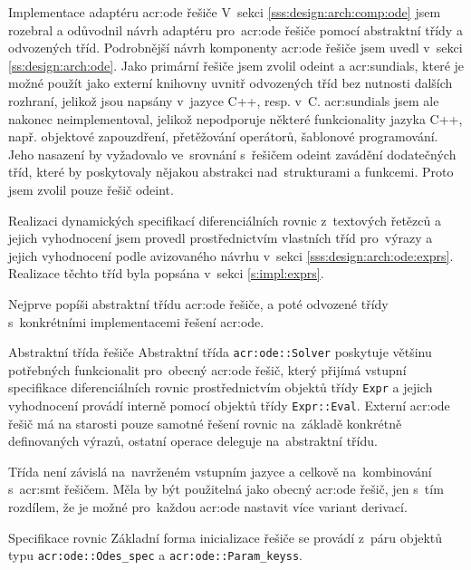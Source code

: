 \documentclass[thesis=M,czech]{FITthesis}[2012/06/26]
\newcommand{\acrlabel}[1]{acr:#1}
\newcommand{\acr}[1]{\acrshort{\acrlabel{#1}}}
\newcommand{\id}[1]{\texttt{#1}}
\newcommand{\rf}[1]{\ref{#1}}
\begin{document}
\begin{section}{Implementace adaptéru \acr{ode} řešiče}\label{s:impl:ode}
V~sekci \rf{sss:design:arch:comp:ode} jsem rozebral
a odůvodnil návrh adaptéru pro~\acr{ode} řešiče
pomocí abstraktní třídy a odvozených tříd.
Podrobnější návrh komponenty \acr{ode} řešiče
jsem uvedl v~sekci \rf{ss:design:arch:ode}.
Jako primární řešiče jsem zvolil odeint a \acr{sundials},
které je možné použít jako externí knihovny
uvnitř odvozených tříd bez nutnosti dalších rozhraní,
jelikož jsou napsány v~jazyce C++, resp. v~C.
\acr{sundials} jsem ale nakonec neimplementoval,
jelikož nepodporuje některé funkcionality jazyka C++,
např. objektové zapouzdření,
přetěžování operátorů, šablonové programování.
Jeho nasazení by vyžadovalo ve~srovnání s~řešičem odeint
zavádění dodatečných tříd,
které by poskytovaly nějakou abstrakci nad~strukturami a funkcemi.
Proto jsem zvolil pouze řešič odeint.

Realizaci dynamických specifikací diferenciálních rovnic
z~textových řetězců a jejich vyhodnocení
jsem provedl prostřednictvím
vlastních tříd pro~výrazy a jejich vyhodnocení
podle avizovaného návrhu v~sekci \rf{sss:design:arch:ode:exprs}.
Realizace těchto tříd byla popsána v~sekci \rf{s:impl:exprs}.

Nejprve popíši abstraktní třídu \acr{ode} řešiče,
a poté odvozené třídy s~konkrétními implementacemi řešení \acr{ode}.


\begin{subsection}{Abstraktní třída řešiče}
\label{ss:impl:ode:solver}
Abstraktní třída \id{\acr{ode}::\-Solver}
poskytuje většinu potřebných funkcionalit
pro~obecný \acr{ode} řešič,
který přijímá vstupní specifikace diferenciálních
rovnic prostřednictvím objektů třídy \id{Expr}
a jejich vyhodnocení provádí interně
pomocí objektů třídy \id{Expr::\-Eval}.
Externí \acr{ode} řešič má na starosti
pouze samotné řešení rovnic na~základě
konkrétně definovaných výrazů,
ostatní operace deleguje na~abstraktní třídu.

Třída není závislá na~navrženém vstupním jazyce
a celkově na~kombinování s~\acr{smt} řešičem.
Měla by být použitelná jako obecný \acr{ode} řešič,
jen s~tím rozdílem, že je možné pro~každou \acr{ode}
nastavit více variant derivací.


\begin{subsubsection}{Specifikace rovnic}\label{sss:impl:ode:solver:spec}
Základní forma inicializace řešiče se provádí
z~páru objektů typu \id{\acr{ode}::\-Odes\_\-spec}
a \id{\acr{ode}::\-Param\_\-keyss}.


\end{subsubsection}
\end{subsection}
\end{section}
\end{document}
